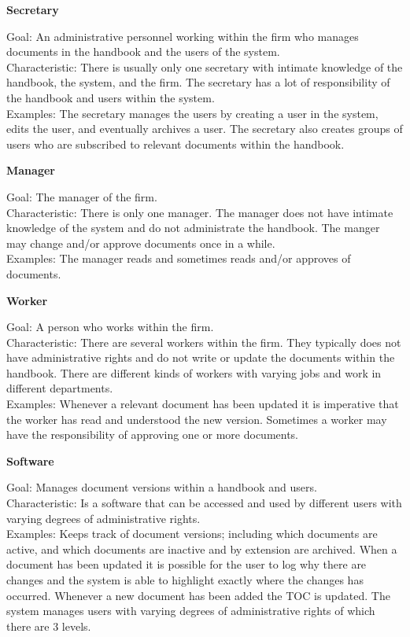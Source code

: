 \textbf{Secretary}

Goal: An administrative personnel working within the firm who manages documents in the handbook and the users of the system.
\\
Characteristic: There is usually only one secretary with intimate knowledge of the handbook, the system, and the firm.
The secretary has a lot of responsibility of the handbook and users within the system.
\\
Examples: The secretary manages the users by creating a user in the system, edits the user, and eventually archives a user.
The secretary also creates groups of users who are subscribed to relevant documents within the handbook.

\textbf{Manager}

Goal: The manager of the firm.
\\
Characteristic: There is only one manager.
The manager does not have intimate knowledge of the system and do not administrate the handbook.
The manger may change and/or approve documents once in a while.
\\
Examples: The manager reads and sometimes reads and/or approves of documents.

\textbf{Worker}

Goal: A person who works within the firm.
\\
Characteristic: There are several workers within the firm.
They typically does not have administrative rights and do not write or update the documents within the handbook.
There are different kinds of workers with varying jobs and work in different departments.
\\
Examples: Whenever a relevant document has been updated it is imperative that the worker has read and understood the new version.
Sometimes a worker may have the responsibility of approving one or more documents.

\textbf{Software}

Goal: Manages document versions within a handbook and users.
\\
Characteristic: Is a software that can be accessed and used by different users with varying degrees of administrative rights.
\\
Examples: Keeps track of document versions; including which documents are active, and which documents are inactive and by extension are archived.
When a document has been updated it is possible for the user to log why there are changes and the system is able to highlight exactly where the changes has occurred.
Whenever a new document has been added the TOC is updated.
The system manages users with varying degrees of administrative rights of which there are 3 levels.


